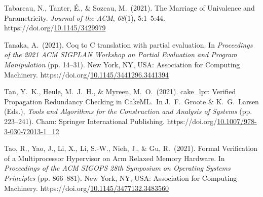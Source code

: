 \documentclass[12pt,twoside]{article}
\begin{document}
{\begin{thebibliography}{1079}
\mdbibitemlabel{}Tabareau, N., Tanter, É., \& Sozeau, M.~(2021). The Marriage of Univalence and Parametricity. \emph{Journal of the ACM}, \emph{68}(1), 5:1–5:44. https://doi.org/\href{https://dx.doi.org/10.1145/3429979}{10.1145/3429979}%

\mdbibitemlabel{}Tanaka, A.~(2021). Coq to C translation with partial evaluation. In \emph{Proceedings of the 2021 ACM SIGPLAN Workshop on Partial Evaluation and Program Manipulation} (pp. 14–31). New York, NY, USA: Association for Computing Machinery. https://doi.org/\href{https://dx.doi.org/10.1145/3441296.3441394}{10.1145/3441296.3441394}%

\mdbibitemlabel{}Tan, Y.~K., Heule, M.~J.~H., \& Myreen, M.~O.~(2021). cake\_lpr: Verified Propagation Redundancy Checking in CakeML.~In J.~F.~Groote \& K.~G.~Larsen (Eds.), \emph{Tools and Algorithms for the Construction and Analysis of Systems} (pp. 223–241). Cham: Springer International Publishing. https://doi.org/\href{https://dx.doi.org/10.1007/978-3-030-72013-1_12}{10.1007/978-3-030-72013-1\_12}%

\mdbibitemlabel{}Tao, R., Yao, J., Li, X., Li, S.-W., Nieh, J., \& Gu, R.~(2021). Formal Verification of a Multiprocessor Hypervisor on Arm Relaxed Memory Hardware. In \emph{Proceedings of the ACM SIGOPS 28th Symposium on Operating Systems Principles} (pp. 866–881). New York, NY, USA: Association for Computing Machinery. https://doi.org/\href{https://dx.doi.org/10.1145/3477132.3483560}{10.1145/3477132.3483560}%


\end{thebibliography}}
\end{document}
